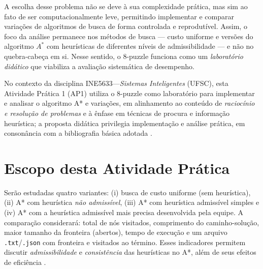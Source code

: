 A escolha desse problema não se deve à sua complexidade prática, mas sim ao fato de ser computacionalmente leve, permitindo implementar e comparar variações de algoritmos de busca de forma controlada e reprodutível. Assim, o foco da análise permanece nos métodos de busca --- custo uniforme e versões do algoritmo $A^*$ com heurísticas de diferentes níveis de admissibilidade --- e não no quebra-cabeça em si. Nesse sentido, o 8-puzzle funciona como um \emph{laboratório didático} que viabiliza a avaliação sistemática de desempenho.

No contexto da disciplina INE5633---\emph{Sistemas Inteligentes} (UFSC), esta Atividade Prática 1 (AP1) utiliza o 8-puzzle como laboratório para implementar e analisar o algoritmo A* e variações, em alinhamento ao conteúdo de \emph{raciocínio e resolução de problemas} e à ênfase em técnicas de procura e informação heurística; a proposta didática privilegia implementação e análise prática, em consonância com a bibliografia básica adotada \cite{russell2010artificial,luger2009artificial}.

\section{Escopo desta Atividade Prática}

Serão estudadas quatro variantes: (i) busca de custo uniforme (sem heurística), (ii) A* com heurística \emph{não admissível}, (iii) A* com heurística admissível simples e (iv) A* com a heurística admissível mais precisa desenvolvida pela equipe. A comparação considerará: total de nós visitados, comprimento do caminho-solução, maior tamanho da fronteira (abertos), tempo de execução e um arquivo \texttt{.txt}/\texttt{.json} com fronteira e visitados ao término. Esses indicadores permitem discutir \emph{admissibilidade} e \emph{consistência} das heurísticas no A*, além de seus efeitos de eficiência \cite{russell2010artificial,luger2009artificial}.

